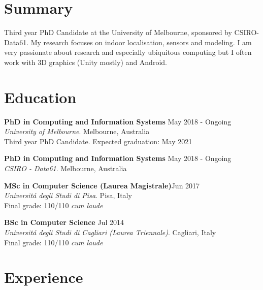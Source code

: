 \documentclass[margin]{res}
\begin{document}
\begin{resume}

\section{Summary}
{Third year PhD Candidate at the University of Melbourne, sponsored by CSIRO-Data61. My research focuses on indoor localisation, sensors and modeling. I am very passionate about research and especially ubiquitous computing but I often work with 3D graphics (Unity mostly) and Android.}

\section{Education}
\textbf{PhD in Computing and Information Systems} \hfill{May 2018 - Ongoing} \\
\textit{University of Melbourne}. Melbourne, Australia\\
Third year PhD Candidate. Expected graduation: May 2021

\textbf{PhD in Computing and Information Systems} \hfill{May 2018 - Ongoing} \\
\textit{CSIRO - Data61}. Melbourne, Australia

\textbf{MSc in Computer Science (Laurea Magistrale)}\hfill Jun 2017 \\
\textit{Universit\'{a} degli Studi di Pisa}. Pisa, Italy \\
Final grade: 110/110 \textit{cum laude}

\textbf{BSc in Computer Science} \hfill Jul 2014 \\
\textit{Universit\'{a} degli Studi di Cagliari (Laurea Triennale)}. Cagliari, Italy
\\Final grade: 110/110 \textit{cum laude}



\section{Experience}


\end{resume}
\end{document}

